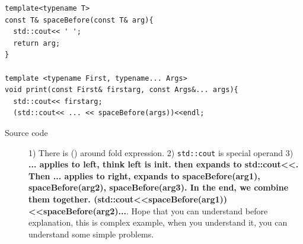 \documentclass[a4paper,11pt,twoside]{book}
\begin{document}
\begin{itemize}
\begin{lstlisting}
template<typename T>
const T& spaceBefore(const T& arg){
  std::cout<< ' ';
  return arg;
}

template <typename First, typename... Args>
void print(const First& firstarg, const Args&... args){
  std::cout<< firstarg;
  (std::cout<< ... << spaceBefore(args))<<endl;
\end{lstlisting}

\begin{description}
    \item[Source code] 1) There is () around fold expression. 2) \texttt{std::cout} is special operand 3) \textbf{... applies to left, think left is init. then expands to std::cout<<. Then ... applies to right, expands to spaceBefore(arg1), spaceBefore(arg2), spaceBefore(arg3). In the end, we combine them together. (std::cout<<spaceBefore(arg1))<<spaceBefore(arg2)...}. Hope that you can understand before explanation, this is complex example, when you understand it, you can understand some simple problems. 
\end{description}
\end{itemize}
\end{document}
